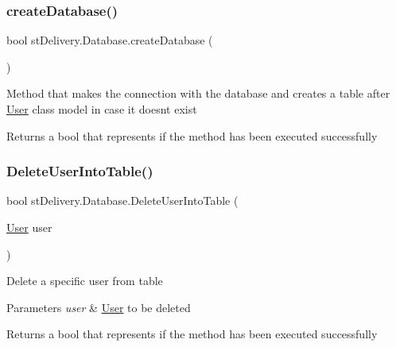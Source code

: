 \subsubsection{\texorpdfstring{create\+Database()}{createDatabase()}}
{\footnotesize\ttfamily bool st\+Delivery.\+Database.\+create\+Database (\begin{DoxyParamCaption}{ }\end{DoxyParamCaption})}



Method that makes the connection with the database and creates a table after \hyperlink{classst_delivery_1_1_user}{User} class model in case it doesn\textquotesingle{}t exist 

\begin{DoxyReturn}{Returns}
a bool that represents if the method has been executed successfully
\end{DoxyReturn}
\mbox{\label{classst_delivery_1_1_database_a8f2fe918677772e104ead36f935e6aa4}} 
\subsubsection{\texorpdfstring{Delete\+User\+Into\+Table()}{DeleteUserIntoTable()}}
{\footnotesize\ttfamily bool st\+Delivery.\+Database.\+Delete\+User\+Into\+Table (\begin{DoxyParamCaption}\item[{\hyperlink{classst_delivery_1_1_user}{User}}]{user }\end{DoxyParamCaption})}



Delete a specific user from table 


\begin{DoxyParams}{Parameters}
{\em user} & \hyperlink{classst_delivery_1_1_user}{User} to be deleted\\
\hline
\end{DoxyParams}
\begin{DoxyReturn}{Returns}
a bool that represents if the method has been executed successfully
\end{DoxyReturn}
\mbox{\label{classst_delivery_1_1_database_adf411e30963819101ad97c16caa00ff6}} 
